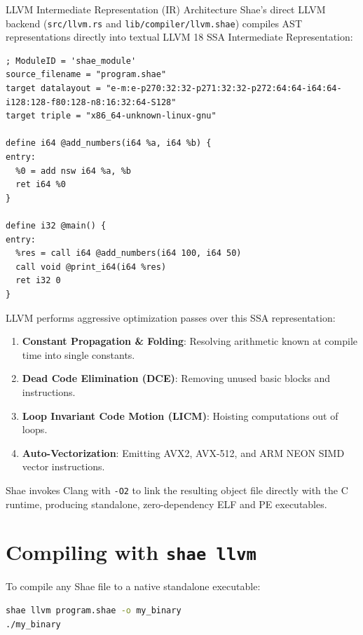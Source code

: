 \begin{deepbox}{LLVM Intermediate Representation (IR) Architecture}
Shae's direct LLVM backend (\texttt{src/llvm.rs} and \texttt{lib/compiler/llvm.shae}) compiles AST representations directly into textual LLVM 18 SSA Intermediate Representation:

\begin{lstlisting}[language=shaelang]
; ModuleID = 'shae_module'
source_filename = "program.shae"
target datalayout = "e-m:e-p270:32:32-p271:32:32-p272:64:64-i64:64-i128:128-f80:128-n8:16:32:64-S128"
target triple = "x86_64-unknown-linux-gnu"

define i64 @add_numbers(i64 %a, i64 %b) {
entry:
  %0 = add nsw i64 %a, %b
  ret i64 %0
}

define i32 @main() {
entry:
  %res = call i64 @add_numbers(i64 100, i64 50)
  call void @print_i64(i64 %res)
  ret i32 0
}
\end{lstlisting}

LLVM performs aggressive optimization passes over this SSA representation:
\begin{enumerate}
    \item \textbf{Constant Propagation \& Folding}: Resolving arithmetic known at compile time into single constants.
    \item \textbf{Dead Code Elimination (DCE)}: Removing unused basic blocks and instructions.
    \item \textbf{Loop Invariant Code Motion (LICM)}: Hoisting computations out of loops.
    \item \textbf{Auto-Vectorization}: Emitting AVX2, AVX-512, and ARM NEON SIMD vector instructions.
\end{enumerate}
Shae invokes Clang with \texttt{-O2} to link the resulting object file directly with the C runtime, producing standalone, zero-dependency ELF and PE executables.
\end{deepbox}

\section{Compiling with \texttt{shae llvm}}

To compile any Shae file to a native standalone executable:
\begin{lstlisting}[language=bash]
shae llvm program.shae -o my_binary
./my_binary
\end{lstlisting}
